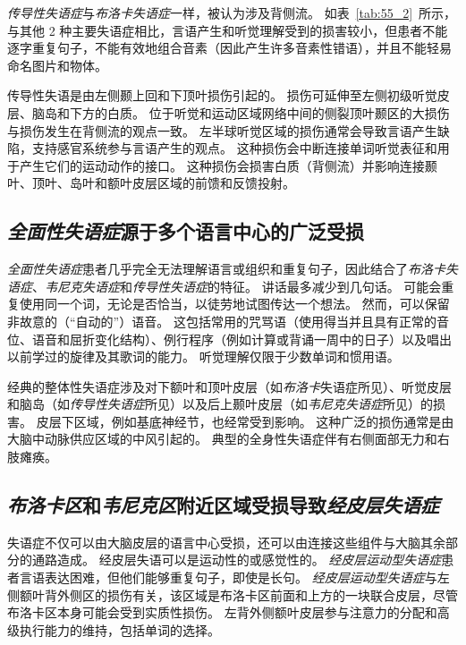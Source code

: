 \textit{传导性失语症}与\textit{布洛卡失语症}一样，被认为涉及背侧流。
如表~\ref{tab:55_2}~所示，与其他 2 种主要失语症相比，言语产生和听觉理解受到的损害较小，但患者不能逐字重复句子，不能有效地组合音素（因此产生许多音素性错语），并且不能轻易命名图片和物体。


传导性失语是由左侧颞上回和下顶叶损伤引起的。
损伤可延伸至左侧初级听觉皮层、脑岛和下方的白质。
位于听觉和运动区域网络中间的侧裂顶叶颞区的大损伤与损伤发生在背侧流的观点一致。
左半球听觉区域的损伤通常会导致言语产生缺陷，支持感官系统参与言语产生的观点。
这种损伤会中断连接单词听觉表征和用于产生它们的运动动作的接口。
这种损伤会损害白质（背侧流）并影响连接颞叶、顶叶、岛叶和额叶皮层区域的前馈和反馈投射。



\subsection{\textit{全面性失语症}源于多个语言中心的广泛受损}

\textit{全面性失语症}患者几乎完全无法理解语言或组织和重复句子，因此结合了\textit{布洛卡失语症}、\textit{韦尼克失语症}和\textit{传导性失语症}的特征。
讲话最多减少到几句话。
可能会重复使用同一个词，无论是否恰当，以徒劳地试图传达一个想法。
然而，可以保留非故意的（“自动的”）语音。
这包括常用的咒骂语（使用得当并且具有正常的音位、语音和屈折变化结构）、例行程序（例如计算或背诵一周中的日子）以及唱出以前学过的旋律及其歌词的能力。
听觉理解仅限于少数单词和惯用语。


经典的整体性失语症涉及对下额叶和顶叶皮层（如\textit{布洛卡}失语症所见）、听觉皮层和脑岛（如\textit{传导性失语症}所见）以及后上颞叶皮层（如\textit{韦尼克失语症}所见）的损害。
皮层下区域，例如基底神经节，也经常受到影响。
这种广泛的损伤通常是由大脑中动脉供应区域的中风引起的。
典型的全身性失语症伴有右侧面部无力和右肢瘫痪。



\subsection{\textit{布洛卡区}和\textit{韦尼克区}附近区域受损导致\textit{经皮层失语症}}

失语症不仅可以由大脑皮层的语言中心受损，还可以由连接这些组件与大脑其余部分的通路造成。
经皮层失语可以是运动性的或感觉性的。
\textit{经皮层运动型失语症}患者言语表达困难，但他们能够重复句子，即使是长句。
\textit{经皮层运动型失语症}与左侧额叶背外侧区的损伤有关，该区域是布洛卡区前面和上方的一块联合皮层，尽管布洛卡区本身可能会受到实质性损伤。
左背外侧额叶皮层参与注意力的分配和高级执行能力的维持，包括单词的选择。


